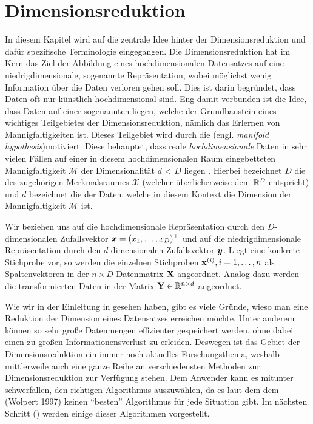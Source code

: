 \chapter{Dimensionsreduktion}
\label{ch:Dimensionsreduktion}

In diesem Kapitel wird auf die zentrale Idee hinter der Dimensionsreduktion und dafür spezifische Terminologie eingegangen.
Die Dimensionsreduktion hat im Kern das Ziel der Abbildung eines hochdimensionalen Datensatzes auf eine niedrigdimensionale, sogenannte  Repräsentation, wobei möglichst wenig Information über die Daten verloren gehen soll. Dies ist darin begründet, dass Daten oft nur künstlich hochdimensional sind. Eng damit verbunden ist die Idee, dass Daten auf einer sogenannten  liegen, welche der Grundbaustein eines wichtiges Teilgebietes der Dimensionsreduktion, nämlich das Erlernen von Mannigfaltigkeiten \parencite{Cayton.2005} ist. Dieses Teilgebiet wird durch die  (engl. \textit{manifold hypothesis})\addref motiviert. Diese behauptet, dass
reale \textit{hochdimensionale} Daten in sehr vielen Fällen auf einer in diesem hochdimensionalen Raum eingebetteten Mannigfaltigkeit $\mathcal{M}$ der Dimensionalität $d$ < $D$ liegen \parencite[vgl.][1]{Cayton.2005}.
Hierbei bezeichnet $D$ die  des zugehörigen Merkmalsraumes $\mathcal{X}$ (welcher überlicherweise dem $\mathbb{R}^D$ entspricht) und $d$ bezeichnet die  der Daten, welche in diesem Kontext die Dimension der Mannigfaltigkeit $\mathcal{M}$ ist.

Wir beziehen uns auf die hochdimensionale Repräsentation durch den $D$-dimensionalen Zufallsvektor $\bm{x} = (x_1, \ldots, x_D)^\top$ und auf die niedrigdimensionale Repräsentation durch den $d$-dimensionalen Zufallsvektor $\bm{y}$.
Liegt eine konkrete Stichprobe vor, so werden die einzelnen Stichproben $\mathbf{x}^{(i)}, i = 1,\ldots,n$ als Spaltenvektoren in der $n \times D$ Datenmatrix $\mathbf{X}$ angeordnet. Analog dazu werden die transformierten Daten in der Matrix $\mathbf{Y} \in \mathbb{R}^{n \times d}$ angeordnet.

Wie wir in der Einleitung in  gesehen haben, gibt es viele Gründe, wieso man eine Reduktion der Dimension eines Datensatzes erreichen möchte. Unter anderem können so sehr große Datenmengen effizienter gespeichert werden, ohne dabei einen zu großen Informationensverlust zu erleiden. Deswegen ist das Gebiet der Dimensionsreduktion ein immer noch aktuelles Forschungsthema, weshalb mittlerweile auch eine ganze Reihe an verschiedensten Methoden zur Dimensionsreduktion zur Verfügung stehen. Dem Anwender kann es mitunter schwerfallen, den richtigen Algorithmus auszuwählen, da es laut dem dem \addref (Wolpert 1997) keinen \enquote{besten} Algorithmus für jede Situation gibt. Im nächsten Schritt () werden einige dieser Algorithmen vorgestellt.

